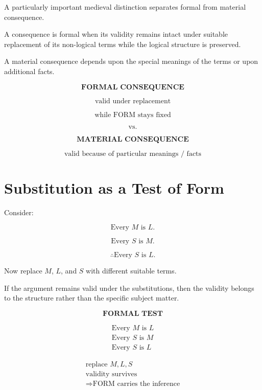 \documentclass[11pt]{article}
\begin{document}
A particularly important medieval distinction separates formal
from material consequence.

A consequence is formal when its validity remains intact under
suitable replacement of its non-logical terms while the logical
structure is preserved.

A material consequence depends upon the special meanings of the
terms or upon additional facts.

\begin{whiteboard}
\[
\textbf{FORMAL CONSEQUENCE}
\]

\[
\text{valid under replacement}
\]

\[
\text{while FORM stays fixed}
\]

\[
\text{vs.}
\]

\[
\textbf{MATERIAL CONSEQUENCE}
\]

\[
\text{valid because of particular meanings / facts}
\]
\end{whiteboard}

\section{Substitution as a Test of Form}

Consider:

\[
\text{Every }M\text{ is }L.
\]

\[
\text{Every }S\text{ is }M.
\]

\[
\therefore \text{Every }S\text{ is }L.
\]

Now replace \(M\), \(L\), and \(S\) with different suitable
terms.

If the argument remains valid under the substitutions, then the
validity belongs to the structure rather than the specific
subject matter.

\begin{whiteboard}
\[
\textbf{FORMAL TEST}
\]

\[
\begin{array}{c}
\text{Every }M\text{ is }L\\
\text{Every }S\text{ is }M\\
\hline
\text{Every }S\text{ is }L
\end{array}
\]

\[
\boxed{
\begin{array}{c}
\text{replace }M,L,S\\
\text{validity survives}\\
\Rightarrow \text{FORM carries the inference}
\end{array}
}
\]
\end{whiteboard}
\end{document}
